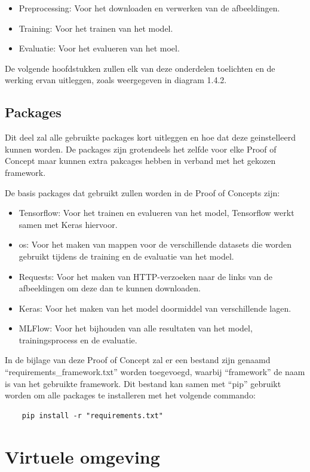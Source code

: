 \begin{itemize}
    \item Preprocessing: Voor het downloaden en verwerken van de afbeeldingen.
    \item Training: Voor het trainen van het model.
    \item Evaluatie: Voor het evalueren van het moel.
\end{itemize}

De volgende hoofdstukken zullen elk van deze onderdelen toelichten en de werking ervan uitleggen, zoals weergegeven in diagram 1.4.2.
\subsection{Packages}
Dit deel zal alle gebruikte packages kort uitleggen en hoe dat deze geinstelleerd kunnen worden. De packages zijn grotendeels het zelfde voor elke Proof of Concept maar kunnen extra pakcages hebben in verband met het gekozen framework.

De basis packages dat gebruikt zullen worden in de Proof of Concepts zijn:
\begin{itemize}
    \item Tensorflow: Voor het trainen en evalueren van het model, Tensorflow werkt samen met Keras hiervoor.
    \item os: Voor het maken van mappen voor de verschillende datasets die worden gebruikt tijdens de training en de evaluatie van het model.
    \item Requests: Voor het maken van HTTP-verzoeken naar de links van de afbeeldingen om deze dan te kunnen downloaden.
    \item Keras: Voor het maken van het model doormiddel van verschillende lagen.
    \item MLFlow: Voor het bijhouden van alle resultaten van het model, trainingsprocess en de evaluatie.
\end{itemize}

In de bijlage van deze Proof of Concept zal er een bestand zijn genaamd ``requirements\_framework.txt'' worden toegevoegd, waarbij ``framework'' de naam is van het gebruikte framework. Dit bestand kan samen met ``pip'' gebruikt worden om alle packages te installeren met het volgende commando:

\begin{verbatim}
    pip install -r "requirements.txt"
\end{verbatim}
\section{Virtuele omgeving}

